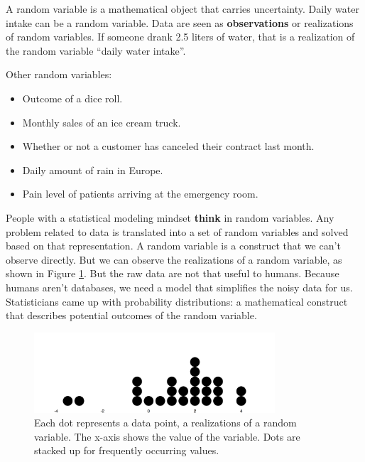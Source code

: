 \documentclass[
  10pt,
]{scrbook}
\providecommand{\tightlist}{%
  \setlength{\itemsep}{0pt}\setlength{\parskip}{0pt}}
\begin{document}
A random variable is a mathematical object that carries uncertainty.
Daily water intake can be a random variable.
Data are seen as \textbf{observations} or realizations of random variables.
If someone drank 2.5 liters of water, that is a realization of the random variable ``daily water intake''.

Other random variables:

\begin{itemize}
\tightlist
\item
  Outcome of a dice roll.
\item
  Monthly sales of an ice cream truck.
\item
  Whether or not a customer has canceled their contract last month.
\item
  Daily amount of rain in Europe.
\item
  Pain level of patients arriving at the emergency room.
\end{itemize}

People with a statistical modeling mindset \textbf{think} in random variables.
Any problem related to data is translated into a set of random variables and solved based on that representation.
A random variable is a construct that we can't observe directly.
But we can observe the realizations of a random variable, as shown in Figure \ref{fig:variable}.
But the raw data are not that useful to humans.
Because humans aren't databases, we need a model that simplifies the noisy data for us.
Statisticians came up with probability distributions: a mathematical construct that describes potential outcomes of the random variable.

\begin{figure}

{\centering \includegraphics[width=0.8\textwidth]{figures/variable-1} 

}

\caption{Each dot represents a data point, a realizations of a random variable. The x-axis shows the value of the variable. Dots are stacked up for frequently occurring values. }\label{fig:variable}
\end{figure}
\end{document}
